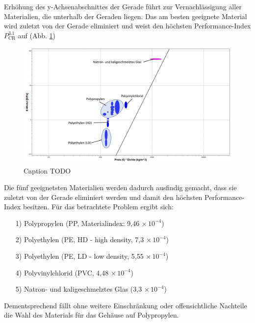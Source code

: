 Erhöhung des y-Achsenabschnittes der Gerade führt zur Vernachlässigung aller Materialien, die unterhalb der Geraden liegen. Das am besten geeignete Material wird zuletzt von der Gerade eliminiert und weist den höchsten Performance-Index $P_{\text{CR}}^{3.1}$ auf (Abb. \ref{fig:ces_3_1_4})\\
\begin{figure}[H]
	\centering
	\includegraphics[width=1.0\linewidth]{chapter/Bilder/3_1_4}
	\caption{Caption TODO}
	\label{fig:ces_3_1_4}
\end{figure}
Die fünf geeignetsten Materialien werden dadurch ausfindig gemacht, dass sie zuletzt von der Gerade eliminiert werden und damit den höchsten Performance-Index besitzen. Für das betrachtete Problem ergibt sich:
\begin{itemize}
\item[1)] Polypropylen (PP, Materialindex: 9,46$\,\times10^{-4}$)
\item[2)] Polyethylen (PE, HD - high density, 7,3$\,\times10^{-4}$)
\item[3)] Polyethylen (PE, LD - low density, 5,55$\,\times10^{-4}$)
\item[4)] Polyvinylchlorid (PVC, 4,48$\,\times10^{-4}$)
\item[5)] Natron- und kaligeschmelztes Glas (3,3$\,\times10^{-4}$)
\end{itemize}
Dementsprechend fällt ohne weitere Einschränkung oder offensichtliche Nachteile die Wahl des Materials für das Gehäuse auf Polypropylen.

